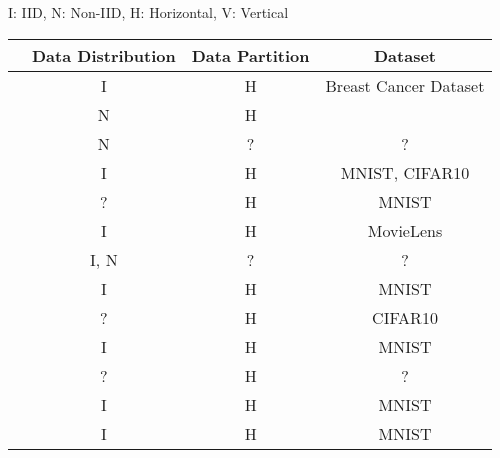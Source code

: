 \begin{table}[htp]
\centering

{ \small I: IID, N: Non-IID, H: Horizontal, V: Vertical \vspace{12pt} }

\begin{tabular}{c|c|c|c}
\hline \hline
                                    & Data Distribution & Data Partition & Dataset                            \\ \hline \hline
\cite{10.1145/3319535.3363256}      & I                 & H              & Breast Cancer Dataset              \\ \hline
\cite{8905038}                      & N                 & H              &                                    \\ \hline
\cite{9524833}                      & N                 & ?              & ?                                 \\ \hline
\cite{9127823}                      & I                 & H              & MNIST, CIFAR10                     \\ \hline
\cite{10.48550/arxiv.2101.03300}    & ?                 & H              & MNIST                              \\ \hline
\cite{9159643}                      & I                 & H              & MovieLens                          \\ \hline
\cite{10.1145/3422337.3447837}      & I, N              & ?              & ?                                  \\ \hline
\cite{9223754}                      & I                 & H              & MNIST                              \\ \hline
\cite{FANG20221}                    & ?                 & H              & CIFAR10                            \\ \hline
\cite{9399813}                      & I                 & H              & MNIST                              \\ \hline
\cite{9184854}                      & ?                 & H              & ?                                  \\ \hline
\cite{8851649}                      & I                 & H              & MNIST                              \\ \hline
\cite{8994206}                      & I                 & H              & MNIST                              \\ \hline

\end{tabular}
\end{table}
